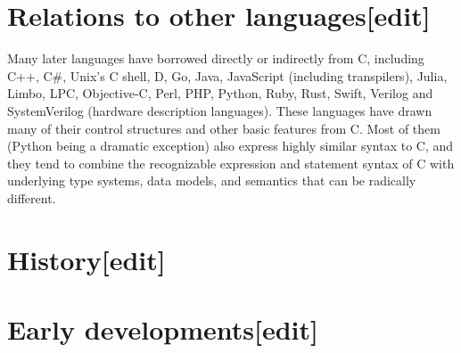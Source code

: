 \documentclass{article}\usepackage{titlesec}
\begin{document}
\section{Relations to other languages[edit]}
Many later languages have borrowed directly or indirectly from C, including C++, C\#, Unix's C shell, D, Go, Java, JavaScript (including transpilers), Julia, Limbo, LPC, Objective-C, Perl, PHP, Python, Ruby, Rust, Swift, Verilog and SystemVerilog (hardware description languages).  These languages have drawn many of their control structures and other basic features from C. Most of them (Python being a dramatic exception) also express highly similar syntax to C, and they tend to combine the recognizable expression and statement syntax of C with underlying type systems, data models, and semantics that can be radically different.
\\

\section{History[edit]}
\section{Early developments[edit]}
\end{document}
